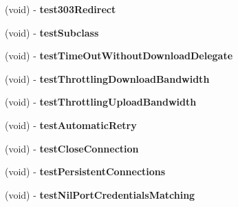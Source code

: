 \begin{DoxyCompactItemize}
\item 
\hypertarget{interface_a_s_i_h_t_t_p_request_tests_a486f80b7859c2c3ea72e06a28fdcf789}{
(void) -\/ {\bfseries test303\-Redirect}}
\label{interface_a_s_i_h_t_t_p_request_tests_a486f80b7859c2c3ea72e06a28fdcf789}

\item 
\hypertarget{interface_a_s_i_h_t_t_p_request_tests_aeb6e4b4f2fc9f3a74b3cd2a6c42341d5}{
(void) -\/ {\bfseries test\-Subclass}}
\label{interface_a_s_i_h_t_t_p_request_tests_aeb6e4b4f2fc9f3a74b3cd2a6c42341d5}

\item 
\hypertarget{interface_a_s_i_h_t_t_p_request_tests_ae19beb94bca46a1dcb81e4729dc89f2f}{
(void) -\/ {\bfseries test\-Time\-Out\-Without\-Download\-Delegate}}
\label{interface_a_s_i_h_t_t_p_request_tests_ae19beb94bca46a1dcb81e4729dc89f2f}

\item 
\hypertarget{interface_a_s_i_h_t_t_p_request_tests_af14e80be1ca16f71c636a799356bb92d}{
(void) -\/ {\bfseries test\-Throttling\-Download\-Bandwidth}}
\label{interface_a_s_i_h_t_t_p_request_tests_af14e80be1ca16f71c636a799356bb92d}

\item 
\hypertarget{interface_a_s_i_h_t_t_p_request_tests_a65f252fc1eea28887974dd1ff8354609}{
(void) -\/ {\bfseries test\-Throttling\-Upload\-Bandwidth}}
\label{interface_a_s_i_h_t_t_p_request_tests_a65f252fc1eea28887974dd1ff8354609}

\item 
\hypertarget{interface_a_s_i_h_t_t_p_request_tests_aed737183009eb013ed056fb74423c9ab}{
(void) -\/ {\bfseries test\-Automatic\-Retry}}
\label{interface_a_s_i_h_t_t_p_request_tests_aed737183009eb013ed056fb74423c9ab}

\item 
\hypertarget{interface_a_s_i_h_t_t_p_request_tests_a266591fd53dafdd64e6b175e59f1439c}{
(void) -\/ {\bfseries test\-Close\-Connection}}
\label{interface_a_s_i_h_t_t_p_request_tests_a266591fd53dafdd64e6b175e59f1439c}

\item 
\hypertarget{interface_a_s_i_h_t_t_p_request_tests_a23d2a0e836cb5aa242ee26182047fc6b}{
(void) -\/ {\bfseries test\-Persistent\-Connections}}
\label{interface_a_s_i_h_t_t_p_request_tests_a23d2a0e836cb5aa242ee26182047fc6b}

\item 
\hypertarget{interface_a_s_i_h_t_t_p_request_tests_acbb0b3611836a7e04e7fe0b1072e0977}{
(void) -\/ {\bfseries test\-Nil\-Port\-Credentials\-Matching}}
\label{interface_a_s_i_h_t_t_p_request_tests_acbb0b3611836a7e04e7fe0b1072e0977}


\end{DoxyCompactItemize}
